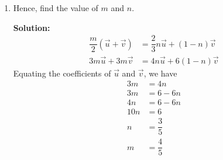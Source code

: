 \documentclass{report}
\newcommand{\sol}{\textbf{Solution:}}
\begin{document}
\begin{enumerate}[leftmargin=*]
\begin{enumerate}
\begin{enumerate}
                              \sol{}
                              \begin{align*}
                                  \overrightarrow{OT} & = \overrightarrow{OQ} + \overrightarrow{QT}             \\
                                                      & = \vec{v} + n\overrightarrow{QR}                        \\
                                                      & = \vec{v} + n\left[\dfrac{2}{3}\vec{u} - \vec{v}\right] \\
                                                      & = \vec{v} + \dfrac{2}{3}n\vec{u} - n\vec{v}             \\
                                                      & = \dfrac{2}{3}n\vec{u} + (1-n)\vec{v}
                              \end{align*}
                    \end{enumerate}

              \item Hence, find the value of $m$ and $n$.

                    \sol{}
                    \begin{align*}
                        \dfrac{m}{2}(\vec{u} + \vec{v}) & = \dfrac{2}{3}n\vec{u} + (1-n)\vec{v} \\
                        3m\vec{u} + 3m\vec{v}           & = 4n\vec{u} + 6(1-n)\vec{v}
                    \end{align*}
                    Equating the coefficients of $\vec{u}$ and $\vec{v}$, we have
                    \begin{align*}
                        3m  & = 4n           \\
                        3m  & = 6 - 6n       \\
                        4n  & = 6 - 6n       \\
                        10n & = 6            \\
                        n   & = \dfrac{3}{5} \\
                        m   & = \dfrac{4}{5}
                    \end{align*}
          \end{enumerate}


\end{enumerate}
\end{document}
